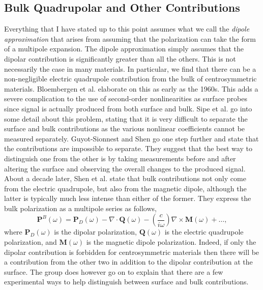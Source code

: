 
\subsection{Bulk Quadrupolar and Other Contributions}\label{chap_theory_quad}

Everything that I have stated up to this point assumes what we call the
\emph{dipole approximation} that arises from assuming that the polarization can
take the form of a multipole expansion. The dipole approximation simply assumes
that the dipolar contribution is significantly greater than all the others. This
is not necessarily the case in many materials. In particular, we find that there
can be a non-negligible electric quadrupole contribution from the bulk of
centrosymmetric materials. Bloembergen et al. \cite{PhysRev.174.813} elaborate
on this as early as the 1960s. This adds a severe complication to the use of
second-order nonlinearities as surface probes since signal is actually produced
from both surface and bulk. Sipe et al. \cite{sipe1987fundamental} go into some
detail about this problem, stating that it is very difficult to separate the
surface and bulk contributions as the various nonlinear coefficients cannot be
measured separately. Guyot-Sionnest and Shen \cite{PhysRevB.38.7985} go one step
further and state that the contributions are impossible to separate. They
suggest that the best way to distinguish one from the other is by taking
measurements before and after altering the surface and observing the overall
changes to the produced signal. About a decade later, Shen et al.
\cite{shen1999surface} state that bulk contributions not only come from the
electric quadrupole, but also from the magnetic dipole, although the latter is
typically much less intense than either of the former. They express the bulk
polarization as a multipole series as follows,
\begin{equation}
\mathbf{P}^{B}(\omega)
= \mathbf{P}_{D}(\omega)
- \nabla\cdot\mathbf{Q}(\omega)
- \left(\frac{c}{i\omega}\right)\nabla\times\mathbf{M}(\omega)
+ \ldots,
\end{equation}
where $\mathbf{P}_{D}(\omega)$ is the dipolar polarization, $\mathbf{Q}(\omega)$
is the electric quadrupole polarization, and $\mathbf{M}(\omega)$ is the
magnetic dipole polarization. Indeed, if only the dipolar contribution is
forbidden for centrosymmetric materials then there will be a contribution from
the other two in addition to the dipolar contribution at the surface. The group
does however go on to explain that there are a few experimental ways to help
distinguish between surface and bulk contributions.


